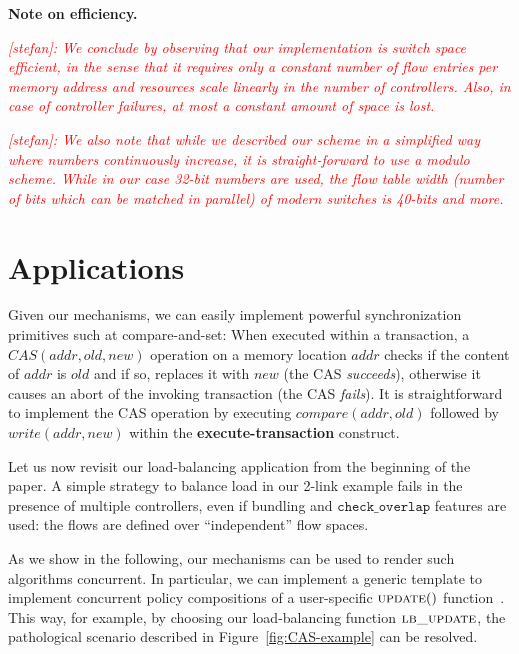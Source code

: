 \documentclass[conference]{sigcomm-alternate}
\newcommand{\cas}{CAS\xspace}
\newcommand{\compare}{compare\xspace}
\newcommand{\memwrite}{write\xspace}
\newcommand{\addr}{\textit{addr}\xspace}
\newcommand{\checko}{\texttt{check\_overlap}\xspace}
\newcommand{\ufunc}{update} %
\newcommand{\stefan}[1]{\textit{\textcolor{red}{[stefan]: #1}}} %
\newcommand{\execatomic}{\textbf{execute-transaction}}
\newcommand{\true}{\textit{true}}
\newcommand{\false}{\textit{false}}
\begin{document}
\vspace{1mm}
\noindent\textbf{Note on efficiency.}

\stefan{We conclude by observing that our implementation is switch space efficient,
in the sense that it requires only a constant number of flow entries per memory address
and resources scale linearly in the number of controllers. Also, in case of controller failures,
at most a constant amount of space is lost.}

\stefan{We also note that while we described our scheme in a simplified
way where numbers continuously increase, it is straight-forward to use a modulo
scheme. While in our case 32-bit numbers are used, 
the flow table width (number of bits which can be matched in parallel)
of modern switches is 40-bits and more.}
 
\section{Applications}\label{sec:apps}

Given our mechanisms, we can easily implement
powerful synchronization primitives such at compare-and-set:
When executed within a
transaction, a $\cas(\addr,\textit{old},\textit{new})$ operation 
on a memory location $\addr$
checks if the content of $\addr$ is $\textit{old}$ and if so,
replaces it with $\textit{new}$ %
(the CAS \emph{succeeds}), otherwise it 
causes an abort of the invoking transaction
(the CAS \emph{fails}).
It is straightforward to implement the CAS operation by executing
$\textit{\compare}(\addr, old)$ followed by $\textit{\memwrite}(\addr,
new)$ within the {\execatomic} construct.

Let us now revisit our load-balancing application
from the beginning of the paper.
A simple strategy to balance load in our 2-link example
 fails in the presence of
multiple controllers, even if 
bundling and $\checko$ features are used:
the flows are defined over ``independent'' 
flow spaces. 

As we show in the following, our mechanisms can be used 
to render such algorithms concurrent.
In particular, we can implement a
generic template to
implement concurrent policy compositions of a user-specific
$\textsc{\ufunc}()$ function~\cite{stn}.
This way, for example, by choosing our load-balancing
function $\textsc{lb\_update}$, 
the pathological scenario described in 
Figure~\ref{fig:CAS-example} can be resolved.
\end{document}
